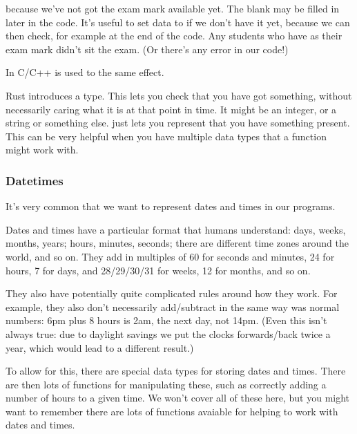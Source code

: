 \documentclass[letterpaper,10pt,british]{sphinxmanual}
\begin{document}
\sphinxAtStartPar
because we’ve not got the exam mark available yet. The blank may be filled in later in the code. It’s useful to set data to  if we don’t have it yet, because we can then check, for example at the end of the code. Any students who have  as their exam mark didn’t sit the exam. (Or there’s any error in our code!)

\sphinxAtStartPar
In C/C++  is used to the same effect.

\sphinxAtStartPar
Rust introduces a  type. This lets you check that you have got something, without necessarily caring what it is at that point in time. It might be an integer, or a string or something else.  just lets you represent that you have something present. This can be very helpful when you have multiple data types that a function might work with.

\sphinxstepscope


\subsubsection{Datetimes}
\label{\detokenize{chapters/programming_fundamentals/datetimes:datetimes}}\label{\detokenize{chapters/programming_fundamentals/datetimes::doc}}
\sphinxAtStartPar
It’s very common that we want to represent dates and times in our programs.

\sphinxAtStartPar
Dates and times have a particular format that humans understand: days, weeks, months, years; hours, minutes, seconds; there are different time zones around the world, and so on. They add in multiples of 60 for seconds and minutes, 24 for hours, 7 for days, and 28/29/30/31 for weeks, 12 for months, and so on.

\sphinxAtStartPar
They also have potentially quite complicated rules around how they work. For example, they also don’t necessarily add/subtract in the same way was normal numbers: 6pm plus 8 hours is 2am, the next day, not 14pm. (Even this isn’t always true: due to daylight savings we put the clocks forwards/back twice a year, which would lead to a different result.)

\sphinxAtStartPar
To allow for this, there are special data types for storing dates and times. There are then lots of functions for manipulating these, such as correctly adding a number of hours to a given time. We won’t cover all of these here, but you might want to remember there are lots of functions avaiable for helping to work with dates and times.
\end{document}
